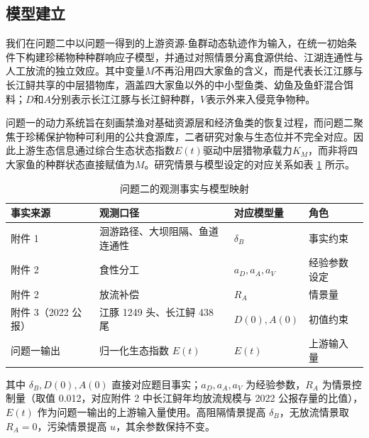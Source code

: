 \subsection{模型建立}
我们在问题二中以问题一得到的上游资源-鱼群动态轨迹作为输入，在统一初始条件下构建珍稀物种种群响应子模型，并通过对照情景分离食源供给、江湖连通性与人工放流的独立效应。其中变量$M$不再沿用四大家鱼的含义，而是代表长江江豚与长江鲟共享的中层猎物库，涵盖四大家鱼以外的中小型鱼类、幼鱼及鱼虾混合饵料；$D$和$A$分别表示长江江豚与长江鲟种群，$V$表示外来入侵竞争物种。

问题一的动力系统旨在刻画禁渔对基础资源层和经济鱼类的恢复过程，而问题二聚焦于珍稀保护物种可利用的公共食源库，二者研究对象与生态位并不完全对应。因此上游生态信息通过综合生态状态指数$E(t)$驱动中层猎物承载力$K_M$，而非将四大家鱼的种群状态直接赋值为$M$。研究情景与模型设定的对应关系如表 \ref{tab:q2map} 所示。
\begin{table}[htbp]
\centering
\caption{问题二的观测事实与模型映射}
\label{tab:q2map}
\begin{tabularx}{0.95\textwidth}{>{\raggedright\arraybackslash}p{2.4cm} >{\raggedright\arraybackslash}p{4.2cm} >{\raggedright\arraybackslash}p{3.6cm} X}
\toprule
事实来源 & 观测口径 & 对应模型量 & 角色 \\
\midrule
附件 1 & 洄游路径、大坝阻隔、鱼道连通性 & $\delta_B$ & 事实约束 \\
附件 2 & 食性分工 & $a_D,a_A,a_V$ & 经验参数设定 \\
附件 2 & 放流补偿 & $R_A$ & 情景量 \\
附件 3（2022 公报） & 江豚 1249 头、长江鲟 438 尾 & $D(0),A(0)$ & 初值约束 \\
问题一输出 & 归一化生态指数 $E(t)$ & $E(t)$ & 上游输入量 \\
\bottomrule
\end{tabularx}
\end{table}
其中 $\delta_B,D(0),A(0)$ 直接对应题目事实；$a_D,a_A,a_V$ 为经验参数，$R_A$ 为情景控制量（取值 0.012，对应附件 2 中长江鲟年均放流规模与 2022 公报存量的比值），$E(t)$ 作为问题一输出的上游输入量使用。高阻隔情景提高 $\delta_B$，无放流情景取 $R_A=0$，污染情景提高 $u$，其余参数保持不变。

